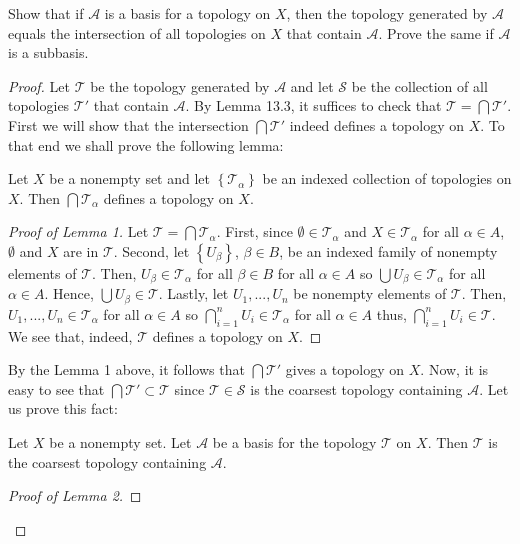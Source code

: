 \begin{problem}[Munkres, \S13, 5.]
Show that if $\mathcal{A}$ is a basis for a topology on $X$, then
the topology generated by $\mathcal{A}$ equals the intersection
of all topologies on $X$ that contain $\mathcal{A}$. Prove the
same if $\mathcal{A}$ is a subbasis.
\end{problem}
\begin{proof}
Let $\mathcal{T}$ be the topology generated by $\mathcal{A}$ and
let $\mathcal{S}$ be the collection of all topologies
$\mathcal{T}'$ that contain $\mathcal{A}$. By Lemma 13.3, it
suffices to check that $\mathcal{T}=\bigcap\mathcal{T}'$. First
we will show that the intersection $\bigcap\mathcal{T}'$ indeed
defines a topology on $X$. To that end we shall prove the
following lemma:
\begin{lemma}
Let $X$ be a nonempty set and let $\left\{\mathcal{T}_\alpha\right\}$ be
an indexed collection of topologies on $X$. Then
$\bigcap\mathcal{T}_\alpha$ defines a topology on $X$.
\end{lemma}
\begin{proof}[Proof of Lemma 1]
\renewcommand\qedsymbol{$\vardiamondsuit$}
Let $\mathcal{T}=\bigcap\mathcal{T}_\alpha$. First, since
$\emptyset\in\mathcal{T}_\alpha$ and $X\in\mathcal{T}_\alpha$ for
all $\alpha\in A$, $\emptyset$ and $X$ are in
$\mathcal{T}$. Second, let $\left\{U_\beta\right\}$, $\beta\in
B$, be an indexed family of nonempty elements of
$\mathcal{T}$. Then, $U_\beta\in \mathcal{T}_\alpha$ for all
$\beta\in B$ for all $\alpha\in A$ so $\bigcup
U_\beta\in\mathcal{T}_\alpha$ for all $\alpha\in A$. Hence,
$\bigcup U_\beta\in\mathcal{T}$. Lastly, let $U_1,...,U_n$ be
nonempty elements of $\mathcal{T}$. Then,
$U_1,...,U_n\in\mathcal{T}_\alpha$ for all $\alpha\in A$ so
$\bigcap_{i=1}^n U_i\in\mathcal{T}_\alpha$ for all $\alpha\in A$
thus, $\bigcap_{i=1}^n U_i\in\mathcal{T}$. We see that, indeed,
$\mathcal{T}$ defines a topology on $X$.
\end{proof}
By the Lemma 1 above, it follows that $\bigcap\mathcal{T}'$ gives
a topology on $X$. Now, it is easy to see that
$\bigcap\mathcal{T}'\subset\mathcal{T}$ since
$\mathcal{T}\in\mathcal{S}$ is the coarsest topology containing
$\mathcal{A}$. Let us prove this fact:
\begin{lemma}
Let $X$ be a nonempty set. Let $\mathcal{A}$  be a basis for the
topology $\mathcal{T}$ on $X$. Then $\mathcal{T}$ is the coarsest
topology containing $\mathcal{A}$.
\end{lemma}
\begin{proof}[Proof of Lemma 2]

\end{proof}
\end{proof}
